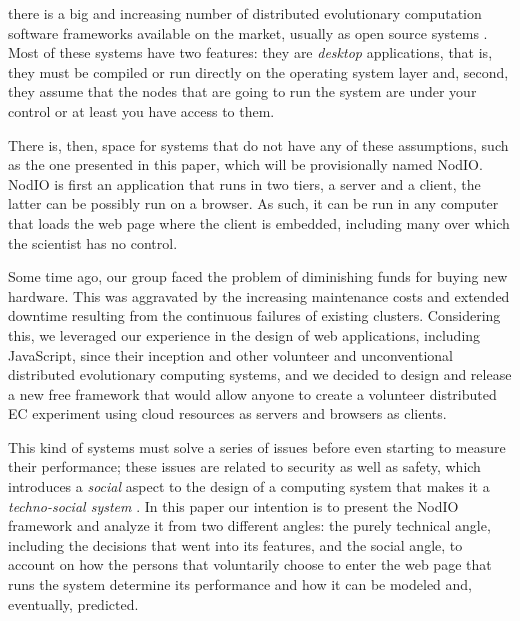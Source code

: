 \documentclass[journal,onecolumn]{IEEEtran}
\begin{document}
 there is a big and increasing number of
distributed evolutionary computation software frameworks available on
the market, usually as open source systems \cite{Parejo12Survey}. Most of these systems have %
two features: they are {\em desktop} applications, that is, they must
be compiled or run directly on the operating system layer and, second,
they assume that the nodes that are going to run the system are under
your control or at least you have access to them.

There is, then, space for systems that do not have any of these %
assumptions, such as the one presented in this paper, which will be
provisionally named {\sf NodIO}. NodIO is first an application that
runs in two tiers, a server and a client, the latter  can be possibly
run on a  %
browser. As such, it can be run in any computer that loads the web
page where the client is embedded, including many over which%
the scientist has no control. 

Some time ago, our group faced the problem of diminishing funds for
buying new     %
hardware. This was aggravated by the increasing maintenance costs and extended downtime resulting from the continuous failures of existing clusters.
Considering this, we leveraged our experience in the design of web
applications, including JavaScript, since their inception and other
volunteer and 
unconventional distributed evolutionary computing systems, and we 
decided to design and release a new free framework that would allow anyone to
create a volunteer distributed EC experiment using cloud resources as
servers and browsers as clients.

This kind of systems must solve a series of issues before even starting to %
measure their performance; these issues are related to security as well as
safety, which introduces a {\em social} aspect to the design of a
computing system that makes it a {\em techno-social system}
\cite{vespignani2009predicting}. In this paper our intention is to
present the {\sf NodIO} framework and analyze it from two different
angles: the purely technical angle, including the decisions that went
into its features, and the social angle, to account on how the persons
that voluntarily choose to enter the web page that runs the system
determine its performance and how it can be modeled and, eventually,
predicted. 
\end{document}
